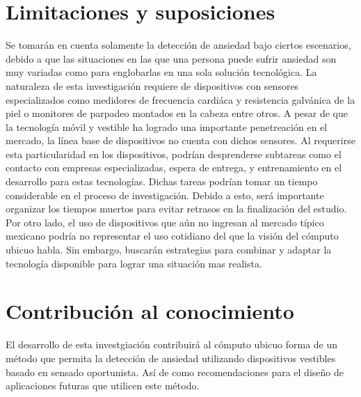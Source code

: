 \documentclass[letterpaper,12pt]{cicese}
\begin{document}
					\chapter{Limitaciones y suposiciones}
			Se tomar\'an en cuenta solamente la detecci\'on de ansiedad bajo ciertos escenarios, debido a que las situaciones en las que una persona puede sufrir ansiedad son muy variadas como para englobarlas en una sola soluci\'on tecnol\'ogica.
			La naturaleza de esta investigaci\'on requiere de dispositivos con sensores especializados como medidores de frecuencia cardi\'aca y resistencia galv\'anica de la piel o monitores de parpadeo montados en la cabeza entre otros. A pesar de que la tecnolog\'ia m\'ovil y vestible ha logrado una importante penetreaci\'on en el mercado, la l\'inea base de dispositivos no cuenta con dichos sensores. Al requerirse esta particularidad en los dispositivos, podr\'ian desprenderse subtareas como el contacto con empresas especializadas, espera de entrega, y entrenamiento en el desarrollo para estas tecnolog\'ias. Dichas tareas podr\'ian tomar un tiempo considerable en el proceso de investigaci\'on. Debido a esto, ser\'a importante organizar los tiempos muertos para evitar retrasos en la finalizaci\'on del estudio.
			Por otro lado, el uso de dispositivos que a\'un no ingresan al mercado t\'ipico mexicano podr\'ia no representar el uso cotidiano del que la visi\'on del  c\'omputo ubicuo habla. Sin embargo, buscar\'an estrategias para combinar y adaptar la tecnolog\'ia disponible para lograr una situaci\'on mas realista.
		\chapter{Contribuci\'on al conocimiento}
			El desarrollo de esta investgiaci\'on contribuir\'a al c\'omputo ubicuo forma de un m\'etodo que permita la detecci\'on de ansiedad utilizando dispositivos vestibles basado en sensado oportunista. As\'i de como recomendaciones para el dise\~no de aplicaciones futuras que utilicen este m\'etodo.
\end{document}
